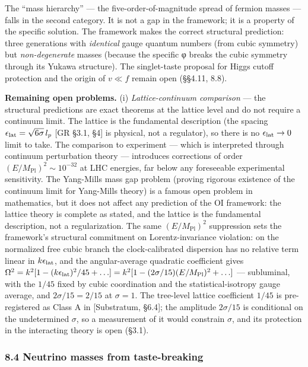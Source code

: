 \documentclass[
]{article}
\begin{document}
The ``mass hierarchy'' --- the five-order-of-magnitude spread of fermion
masses --- falls in the second category. It is not a gap in the
framework; it is a property of the specific solution. The framework
makes the correct structural prediction: three generations with
\emph{identical} gauge quantum numbers (from cubic symmetry) but
\emph{non-degenerate} masses (because the specific φ breaks the cubic
symmetry through its Yukawa structure). The singlet-taste proposal for
Higgs cutoff protection and the origin of \(v\ll f\) remain open
(§§4.11, 8.8).

\textbf{Remaining open problems.} (i) \emph{Lattice-continuum
comparison} --- the structural predictions are exact theorems at the
lattice level and do not require a continuum limit. The lattice is the
fundamental description (the spacing
\(\epsilon_{\rm lat} = \sqrt{6\sigma}\,l_p\) {[}GR §3.1, §4{]} is
physical, not a regulator), so there is no \(\epsilon_{\rm lat} \to 0\)
limit to take. The comparison to experiment --- which is interpreted
through continuum perturbation theory --- introduces corrections of
order \((E/M_{\text{Pl}})^2 \sim 10^{-32}\) at LHC energies, far below
any foreseeable experimental sensitivity. The Yang-Mills mass gap
problem (proving rigorous existence of the continuum limit for
Yang-Mills theory) is a famous open problem in mathematics, but it does
not affect any prediction of the OI framework: the lattice theory is
complete as stated, and the lattice is the fundamental description, not
a regularization. The same \((E/M_{\text{Pl}})^2\) suppression sets the
framework's structural commitment on Lorentz-invariance violation: on
the normalized free cubic branch the clock-calibrated dispersion has no
relative term linear in \(k\epsilon_{\rm lat}\), and the angular-average
quadratic coefficient gives
\(\Omega^2 = k^2[1 - (k\epsilon_{\rm lat})^2/45 + \ldots] = k^2[1 - (2\sigma/15)(E/M_{\text{Pl}})^2 + \ldots]\)
--- subluminal, with the \(1/45\) fixed by cubic coordination and the
statistical-isotropy gauge average, and \(2\sigma/15 = 2/15\) at
\(\sigma = 1\). The tree-level lattice coefficient \(1/45\) is
pre-registered as Class A in {[}Substratum, §6.4{]}; the amplitude
\(2\sigma/15\) is conditional on the undetermined \(\sigma\), so a
measurement of it would constrain \(\sigma\), and its protection in the
interacting theory is open (§3.1).

\hypertarget{neutrino-masses-from-taste-breaking}{%
\subsubsection{8.4 Neutrino masses from
taste-breaking}\label{neutrino-masses-from-taste-breaking}}
\end{document}
